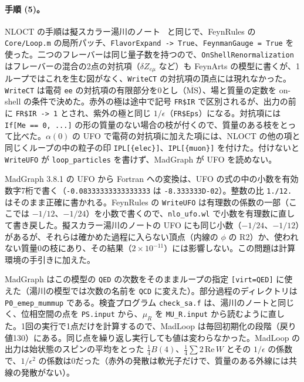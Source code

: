 \documentclass[a4paper,10pt]{ltjsarticle}
\newcommand{\MSbar}{\overline{\mathrm{MS}}}
\begin{document}
\paragraph{手順 (5)。}NLOCT の手順は擬スカラー湯川のノート~\cite{yukawanote} と同じで、FeynRules の \texttt{Core/Loop.m} の局所パッチ、\texttt{FlavorExpand -> True}、\texttt{FeynmanGauge = True} を使った。二つのフレーバーは同じ量子数を持つので、\texttt{OnShellRenormalization} はフレーバーの混合の2点の対抗項（$\delta Z_{e\mu}$ など）も FeynArts の模型に書くが、1ループではこれを生む図がなく、\texttt{WriteCT} の対抗項の頂点には現れなかった。\texttt{WriteCT} は電荷 \texttt{ee} の対抗項の有限部分を0とし（$\MSbar$）、場と質量の定数を on-shell の条件で決めた。赤外の極は途中で記号 \texttt{FR\$IR} で区別されるが、出力の前に \texttt{FR\$IR -> 1} とされ、紫外の極と同じ $1/\epsilon$（\texttt{FR\$Eps}）になる。対抗項には \texttt{If[Me == 0, ...]} の形の質量のない場合の枝が付くので、質量のある枝をとって比べた。$\alpha(0)$ の UFO で電荷の対抗項に加えた項には、NLOCT の他の項と同じくループの中の粒子の印 \texttt{IPL[\{elec\}]}、\texttt{IPL[\{muon\}]} を付けた。付けないと \texttt{WriteUFO} が \texttt{loop\_particles} を書けず、MadGraph が UFO を読めない。

MadGraph 3.8.1 の UFO から Fortran への変換は、UFO の式の中の小数を有効数字7桁で書く（\texttt{-0.08333333333333333} は \texttt{-8.333333D-02}）。整数の比 \texttt{1./12.} はそのまま正確に書かれる。FeynRules の \texttt{WriteUFO} は有理数の係数の一部（ここでは $-1/12$、$-1/24$）を小数で書くので、\texttt{nlo\_ufo.wl} で小数を有理数に直して書き戻した。擬スカラー湯川のノートの UFO にも同じ小数（$-1/24$、$-1/12$）があるが、それらは確かめた過程に入らない頂点（内線の $\phi$ の R2）か、使われない質量0の枝にあり、その結果（$2\times10^{-11}$）には影響しない。この問題は計算環境の手引きに加えた。

MadGraph はこの模型の \texttt{QED} の次数をそのままループの指定 \texttt{[virt=QED]} に使えた（湯川の模型では次数の名前を \texttt{QCD} に変えた）。部分過程のディレクトリは \texttt{P0\_emep\_mummup} である。検査プログラム \texttt{check\_sa.f} は、湯川のノートと同じく、位相空間の点を \texttt{PS.input} から、$\mu_R$ を \texttt{MU\_R.input} から読むように直した。1回の実行で1点だけを計算するので、MadLoop は毎回初期化の段階（戻り値130）にある。同じ点を繰り返し実行しても値は変わらなかった。MadLoop の出力は始状態のスピンの平均をとった $\frac14B(4)$、$\frac14\sum2\,\mathrm{Re}\,W$ とその $1/\epsilon$ の係数で、$1/\epsilon^2$ の係数は0だった（赤外の発散は軟光子だけで、質量のある外線には共線の発散がない）。
\end{document}
